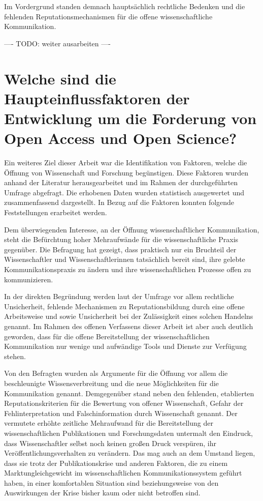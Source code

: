Im Vordergrund standen demnach hauptsächlich rechtliche Bedenken und die fehlenden Reputationsmechanismen für die offene wissenschaftliche Kommunikation.

---- TODO: weiter ausarbeiten ----

\section{Welche sind die Haupteinflussfaktoren der Entwicklung um die Forderung von Open Access und Open Science?}

Ein weiteres Ziel dieser Arbeit war die Identifikation von Faktoren, welche die Öffnung von Wissenschaft und Forschung begünstigen. Diese Faktoren wurden anhand der Literatur herausgearbeitet und im Rahmen der durchgeführten Umfrage abgefragt. Die erhobenen Daten wurden statistisch ausgewertet und zusammenfassend dargestellt. In Bezug auf die Faktoren konnten folgende Feststellungen erarbeitet werden.

Dem überwiegenden Interesse, an der Öffnung wissenschaftlicher Kommunikation, steht die Befürchtung hoher Mehraufwände für die wissenschaftliche Praxis gegenüber. Die Befragung hat gezeigt, dass praktisch nur ein Bruchteil der Wissenschaftler und Wissenschaftlerinnen tatsächlich bereit sind, ihre gelebte Kommunikationspraxis zu ändern und ihre wissenschaftlichen Prozesse offen zu kommunizieren.

In der direkten Begründung werden laut der Umfrage vor allem rechtliche Unsicherheit, fehlende Mechanismen zu Reputationsbildung durch eine offene Arbeitsweise und sowie Unsicherheit bei der Zulässigkeit eines solchen Handelns genannt. Im Rahmen des offenen Verfassens dieser Arbeit ist aber auch deutlich geworden, dass für die offene Bereitstellung der wissenschaftlichen Kommunikation nur wenige und aufwändige Tools und Dienste zur Verfügung stehen.

Von den Befragten wurden als Argumente für die Öffnung vor allem die beschleunigte Wissensverbreitung und die neue Möglichkeiten für die Kommunikation genannt. Demgegenüber stand neben den fehlenden, etablierten Reputationskriterien für die Bewertung von offener Wissenschaft, Gefahr der Fehlinterpretation und Falschinformation durch Wissenschaft genannt. Der vermutete erhöhte zeitliche Mehraufwand für die Bereitstellung der wissenschaftlichen Publikationen und Forschungsdaten untermalt den Eindruck, dass Wissenschaftler selbst noch keinen großen Druck verspüren, ihr Veröffentlichungsverhalten zu verändern. Das mag auch an dem Umstand liegen, dass sie trotz der Publikationskrise und anderen Faktoren, die zu einem Marktungleichgewicht im wissenschaftlichen Kommunikationssystem geführt haben, in einer komfortablen Situation sind beziehungsweise von den Auswirkungen der Krise bisher kaum oder nicht betroffen sind.

